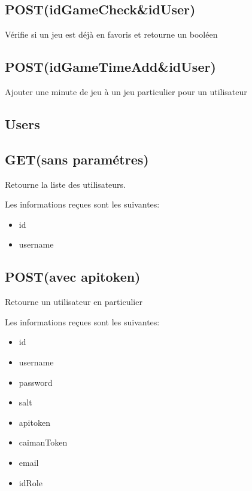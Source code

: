 \documentclass[a4paper,12pt,french]{sphinxmanual}
\begin{document}
\subsection{POST(idGameCheck\&idUser)}
\label{\detokenize{fonctionnelle:post-idgamecheck-iduser}}
\sphinxAtStartPar
Vérifie si un jeu est déjà en favoris et retourne un booléen


\subsection{POST(idGameTimeAdd\&idUser)}
\label{\detokenize{fonctionnelle:post-idgametimeadd-iduser}}
\sphinxAtStartPar
Ajouter une minute de jeu à un jeu particulier pour un utilisateur


\subsection{Users}
\label{\detokenize{fonctionnelle:users}}

\subsection{GET(sans paramétres)}
\label{\detokenize{fonctionnelle:get-sans-parametres}}
\sphinxAtStartPar
Retourne la liste des utilisateurs.

\sphinxAtStartPar
Les informations reçues sont les suivantes:
\begin{itemize}
\item {} 
\sphinxAtStartPar
id

\item {} 
\sphinxAtStartPar
username

\end{itemize}


\subsection{POST(avec apitoken)}
\label{\detokenize{fonctionnelle:post-avec-apitoken}}
\sphinxAtStartPar
Retourne un utilisateur en particulier

\sphinxAtStartPar
Les informations reçues sont les suivantes:
\begin{itemize}
\item {} 
\sphinxAtStartPar
id

\item {} 
\sphinxAtStartPar
username

\item {} 
\sphinxAtStartPar
password

\item {} 
\sphinxAtStartPar
salt

\item {} 
\sphinxAtStartPar
apitoken

\item {} 
\sphinxAtStartPar
caimanToken

\item {} 
\sphinxAtStartPar
email

\item {} 
\sphinxAtStartPar
idRole

\end{itemize}
\end{document}
